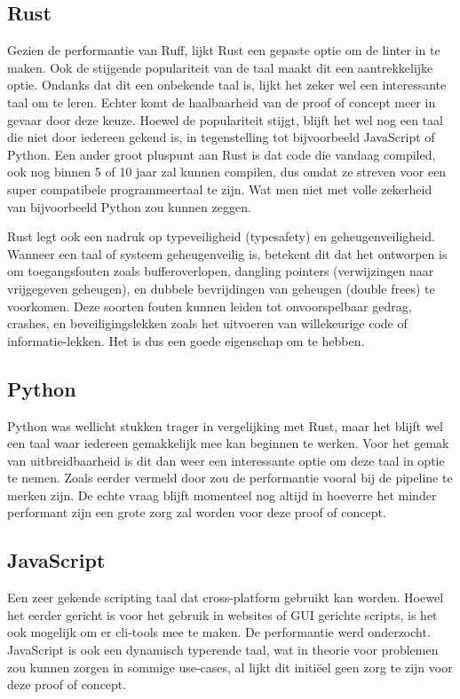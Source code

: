 \subsection{Rust}
Gezien de performantie van Ruff, lijkt Rust een gepaste optie om de linter in te maken. Ook de stijgende populariteit van de taal maakt dit een aantrekkelijke optie. Ondanks dat dit een onbekende taal is, lijkt het zeker wel een interessante taal om te leren. Echter komt de haalbaarheid van de proof of concept meer in gevaar door deze keuze. Hoewel de populariteit stijgt, blijft het wel nog een taal die niet door iedereen gekend is, in tegenstelling tot bijvoorbeeld JavaScript of Python. Een ander groot pluspunt aan Rust is dat code die vandaag compiled, ook nog binnen 5 of 10 jaar zal kunnen compilen, dus omdat ze streven voor een super compatibele programmeertaal te zijn. Wat men niet met volle zekerheid van bijvoorbeeld Python zou kunnen zeggen. 
 
Rust legt ook een nadruk op typeveiligheid (typesafety) en geheugenveiligheid. Wanneer een taal of systeem geheugenveilig is, betekent dit dat het ontworpen is om toegangsfouten zoals bufferoverlopen, dangling pointers (verwijzingen naar vrijgegeven geheugen), en dubbele bevrijdingen van geheugen (double frees) te voorkomen. Deze soorten fouten kunnen leiden tot onvoorspelbaar gedrag, crashes, en beveiligingslekken zoals het uitvoeren van willekeurige code of informatie-lekken. Het is dus een goede eigenschap om te hebben.\autocite{Klabnik2022}

\subsection{Python}
Python was wellicht stukken trager in vergelijking met Rust, maar het blijft wel een taal waar iedereen gemakkelijk mee kan beginnen te werken. Voor het gemak van uitbreidbaarheid is dit dan weer een interessante optie om deze taal in optie te nemen. Zoals eerder vermeld door \textcite{TurnerTrauring2023} zou de performantie vooral bij de pipeline te merken zijn.
De echte vraag blijft momenteel nog altijd in hoeverre het minder performant zijn een grote zorg zal worden voor deze proof of concept.

\subsection{JavaScript}
Een zeer gekende scripting taal dat cross-platform gebruikt kan worden. Hoewel het eerder gericht is voor het gebruik in websites of GUI gerichte scripts, is het ook mogelijk om er cli-tools mee te maken. De performantie werd onderzocht. JavaScript is ook een dynamisch typerende taal, wat in theorie voor problemen zou kunnen zorgen in sommige use-cases, al lijkt dit initiëel geen zorg te zijn voor deze proof of concept.\autocite{MDN2024}

